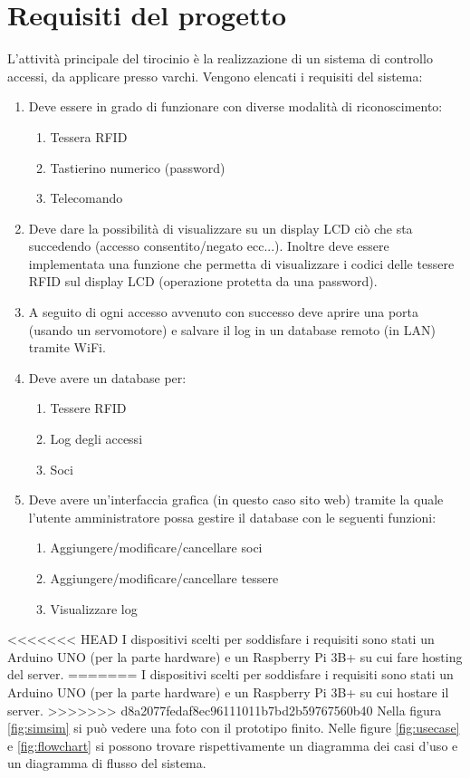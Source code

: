 \documentclass[12pt]{report}
\begin{document}
%
\section{Requisiti del progetto}
%

L'attività principale del tirocinio è la realizzazione di un sistema di controllo accessi, da applicare presso varchi. Vengono elencati i requisiti del sistema:

\begin{enumerate}
	\item Deve essere in grado di funzionare con diverse modalità di riconoscimento:
	\begin{enumerate}
		\item Tessera RFID
		\item Tastierino numerico (password)
		\item Telecomando 
	\end{enumerate}
	\item Deve dare la possibilità di visualizzare su un display LCD ciò che sta succedendo (accesso consentito/negato ecc...). Inoltre deve essere implementata una funzione che permetta di visualizzare i codici delle tessere RFID sul display LCD (operazione protetta da una password).
	\item A seguito di ogni accesso avvenuto con successo deve aprire una porta (usando un servomotore) e salvare il log in un database remoto (in LAN) tramite WiFi.
	\item Deve avere un database per:
	\begin{enumerate}
		\item Tessere RFID
		\item Log degli accessi
		\item Soci
	\end{enumerate}
	\item Deve avere un'interfaccia grafica (in questo caso sito web) tramite la quale l'utente amministratore possa gestire il database con le seguenti funzioni: \begin{enumerate}
		\item Aggiungere/modificare/cancellare soci 
		\item Aggiungere/modificare/cancellare tessere 
		\item Visualizzare log
	\end{enumerate}
\end{enumerate}

<<<<<<< HEAD
I dispositivi scelti per soddisfare i requisiti sono stati un Arduino UNO (per la parte hardware) e un Raspberry Pi 3B+ su cui fare hosting del server. 
=======
I dispositivi scelti per soddisfare i requisiti sono stati un Arduino UNO (per la parte hardware) e un Raspberry Pi 3B+ su cui hostare il server. 
>>>>>>> d8a2077fedaf8ec96111011b7bd2b59767560b40
Nella figura \ref{fig:simsim} si può vedere una foto con il prototipo finito.
Nelle figure \ref{fig:usecase} e \ref{fig:flowchart} si possono trovare rispettivamente un diagramma dei casi d'uso e un diagramma di flusso del sistema.
\end{document}
